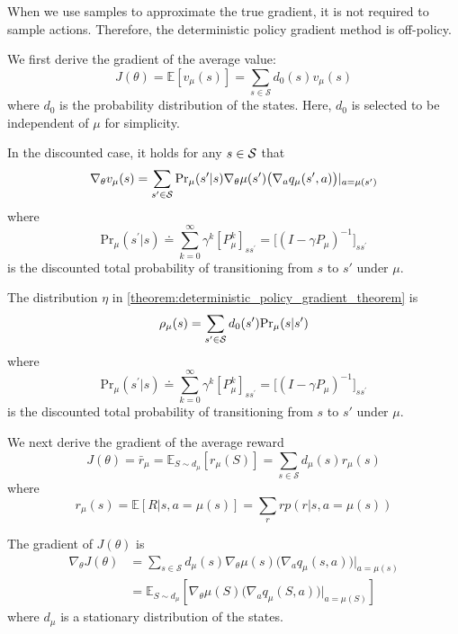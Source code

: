 \documentclass[10pt]{elegantbook}
\begin{document}
When we use samples to approximate the true gradient, it is not required to sample actions. Therefore, the deterministic policy gradient method is off-policy.

We first derive the gradient of the average value:
\begin{equation}
    J(\theta)=\mathbb{E}[v_{\mu}(s)]=\sum_{s\in{\mathcal{S}}}d_{0}(s)v_{\mu}(s)
\end{equation}
where $d_0$ is the probability distribution of the states. Here, $d_0$ is selected to be independent
of $\mu$ for simplicity.


\begin{lemma}[Gradient of $v_{\mu}(s)$]
    In the discounted case, it holds for any $s \in \cal S$ that
    \begin{equation}
        \nabla_{\theta}v_{\mu}(s)
        =\sum_{s^{\prime}\in{\cal S}}\mathrm{Pr}_{\mu}(s^{\prime}|s)
        \nabla_{\theta}\mu(s^{\prime})\big(\nabla_{a}q_{\mu}(s^{\prime},a)\big)|_{a=\mu(s^{\prime})}
    \end{equation}
    where 
    \[
        \mathrm{Pr}_{\mu}(s^{\prime}|s)\doteq\sum_{k=0}^{\infty}\gamma^{k}[P_{\mu}^{k}]_{s s^{\prime}}=\big[(I-\gamma P_{\mu})^{-1}\big]_{s s^{\prime}}
    \]
    is the discounted total probability of transitioning from $s$ to $s'$ under $\mu$.
\end{lemma}

\begin{theorem}
    The distribution $\eta$ in \ref{theorem:deterministic_policy_gradient_theorem} is
    \[
        \rho_{\mu}(s)=\sum_{s^{\prime}\in{\cal S}}d_{0}(s^{\prime})\mathrm{Pr}_{\mu}(s|s^{\prime})
    \]
    where 
    \[
        \mathrm{Pr}_{\mu}(s^{\prime}|s)\doteq\sum_{k=0}^{\infty}\gamma^{k}[P_{\mu}^{k}]_{s s^{\prime}}=\big[(I-\gamma P_{\mu})^{-1}\big]_{s s^{\prime}}
    \]
    is the discounted total probability of transitioning from $s$ to $s'$ under $\mu$.
\end{theorem}

We next derive the gradient of the average reward
\begin{equation}
    J(\theta) = \bar r_{\mu} = \mathbb{E}_{S \sim d_{\mu}}[r_{\mu}(S)]=\sum_{s\in{\mathcal{S}}}d_{\mu}(s)r_{\mu}(s)
\end{equation}
where
\[
    r_{\mu}(s)=\mathbb{E}[R|s,a=\mu(s)]=\sum_{r}r p(r|s,a=\mu(s))
\]

\begin{theorem}
    The gradient of $J(\theta)$ is
    \begin{equation}
        \begin{aligned}
            \nabla_{\theta}J(\theta) &= \sum_{s\in{\mathcal{S}}}d_{\mu}(s)\nabla_{\theta}\mu(s)\big(\nabla_{a}q_{\mu}(s,a)\big)\big|_{a=\mu(s)} \\
            &= \mathbb{E}_{S\sim d_{\mu}}\left[\nabla_{\theta}\mu(S)\big(\nabla_{a}q_{\mu}(S,a)\big)|_{a=\mu(S)}\right]
        \end{aligned}
    \end{equation}
    where $d_{\mu}$ is a stationary distribution of the states.
\end{theorem}
\end{document}
